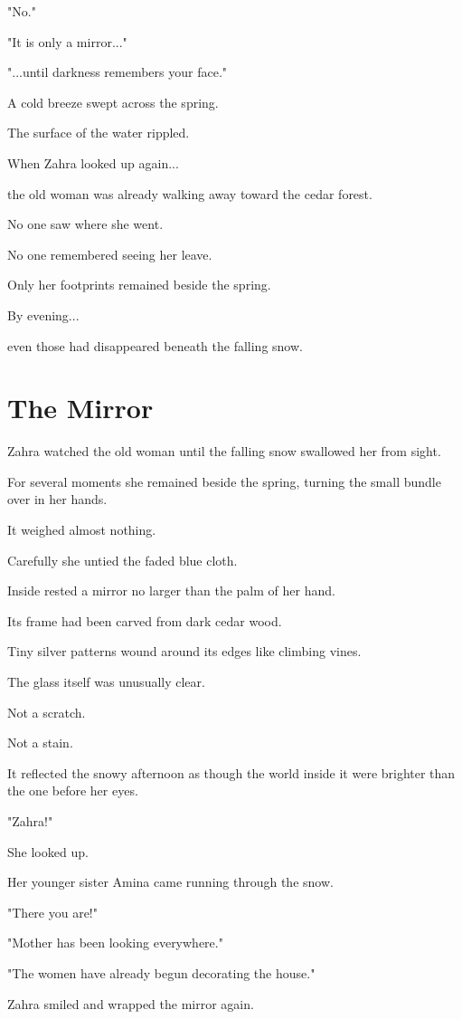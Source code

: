 \documentclass[12pt,openany]{book}
\begin{document}
"No."

"It is only a mirror..."

"...until darkness remembers your face."

A cold breeze swept across the spring.

The surface of the water rippled.

When Zahra looked up again...

the old woman was already walking away toward the cedar forest.

No one saw where she went.

No one remembered seeing her leave.

Only her footprints remained beside the spring.

By evening...

even those had disappeared beneath the falling snow.
\section*{The Mirror}

Zahra watched the old woman until the falling snow swallowed her from sight.

For several moments she remained beside the spring, turning the small bundle over in her hands.

It weighed almost nothing.

Carefully she untied the faded blue cloth.

Inside rested a mirror no larger than the palm of her hand.

Its frame had been carved from dark cedar wood.

Tiny silver patterns wound around its edges like climbing vines.

The glass itself was unusually clear.

Not a scratch.

Not a stain.

It reflected the snowy afternoon as though the world inside it were brighter than the one before her eyes.

"Zahra!"

She looked up.

Her younger sister Amina came running through the snow.

"There you are!"

"Mother has been looking everywhere."

"The women have already begun decorating the house."

Zahra smiled and wrapped the mirror again.
\end{document}
